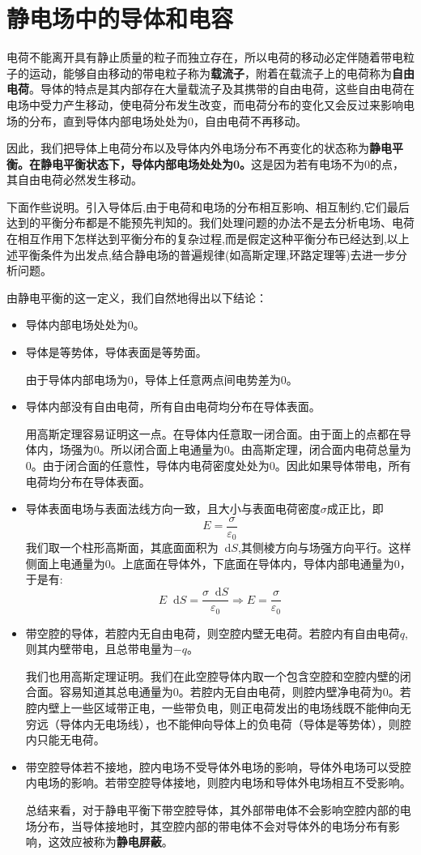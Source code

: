 \documentclass[12pt,a4paper,oneside]{report}
\theoremstyle{definition}
\theoremstyle{remark}
\renewcommand{\d}{\mathop{}\!\mathrm{d}}
\begin{document}
\section{静电场中的导体和电容}
电荷不能离开具有静止质量的粒子而独立存在，所以电荷的移动必定伴随着带电粒子的运动，能够自由移动的带电粒子称为\textbf{载流子}，附着在载流子上的电荷称为\textbf{自由电荷}。导体的特点是其内部存在大量载流子及其携带的自由电荷，这些自由电荷在电场中受力产生移动，使电荷分布发生改变，而电荷分布的变化又会反过来影响电场的分布，直到导体内部电场处处为0，自由电荷不再移动。

因此，我们把导体上电荷分布以及导体内外电场分布不再变化的状态称为\textbf{静电平衡。在静电平衡状态下，导体内部电场处处为0。}这是因为若有电场不为0的点，其自由电荷必然发生移动。

下面作些说明。引入导体后,由于电荷和电场的分布相互影响、相互制约,它们最后达到的平衡分布都是不能预先判知的。我们处理问题的办法不是去分析电场、电荷在相互作用下怎样达到平衡分布的复杂过程,而是假定这种平衡分布已经达到,以上述平衡条件为出发点,结合静电场的普遍规律(如高斯定理,环路定理等)去进一步分析问题。

由静电平衡的这一定义，我们自然地得出以下结论：
\begin{itemize}
  \item 导体内部电场处处为0。
  \item 导体是等势体，导体表面是等势面。
  
  由于导体内部电场为0，导体上任意两点间电势差为0。
  \item 导体内部没有自由电荷，所有自由电荷均分布在导体表面。
  
  用高斯定理容易证明这一点。在导体内任意取一闭合面。由于面上的点都在导体内，场强为0。所以闭合面上电通量为0。由高斯定理，闭合面内电荷总量为0。由于闭合面的任意性，导体内电荷密度处处为0。因此如果导体带电，所有电荷均分布在导体表面。

  \item 导体表面电场与表面法线方向一致，且大小与表面电荷密度$\sigma$成正比，即
  \[
  E = \frac{\sigma}{\varepsilon_0}
  \]
  我们取一个柱形高斯面，其底面面积为$\d S$,其侧棱方向与场强方向平行。这样侧面上电通量为0。上底面在导体外，下底面在导体内，导体内部电通量为0，于是有:
  \[
  E \d S = \frac{\sigma \d S}{\varepsilon_0}
  \Rightarrow E = \frac{\sigma}{\varepsilon_0}
  \]

  \item 带空腔的导体，若腔内无自由电荷，则空腔内壁无电荷。若腔内有自由电荷$q$,则其内壁带电，且总带电量为$-q$。
  
  我们也用高斯定理证明。我们在此空腔导体内取一个包含空腔和空腔内壁的闭合面。容易知道其总电通量为0。若腔内无自由电荷，则腔内壁净电荷为0。若腔内壁上一些区域带正电，一些带负电，则正电荷发出的电场线既不能伸向无穷远（导体内无电场线），也不能伸向导体上的负电荷（导体是等势体），则腔内只能无电荷。

  \item 带空腔导体若不接地，腔内电场不受导体外电场的影响，导体外电场可以受腔内电场的影响。若带空腔导体接地，则腔内电场和导体外电场相互不受影响。
  
  总结来看，对于静电平衡下带空腔导体，其外部带电体不会影响空腔内部的电场分布，当导体接地时，其空腔内部的带电体不会对导体外的电场分布有影响，这效应被称为\textbf{静电屏蔽}。
\end{itemize}
\end{document}

